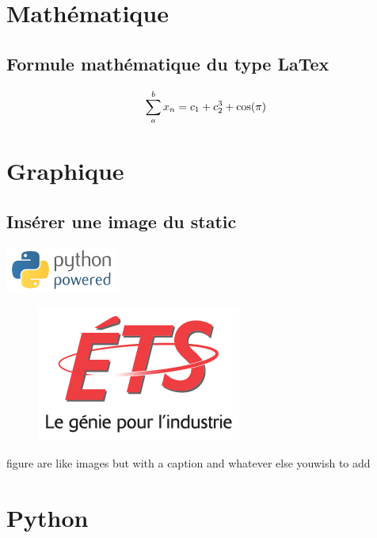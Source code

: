 \documentclass[letterpaper,10pt,english]{sphinxmanual}
\begin{document}
\section{Mathématique}
\label{sphinx:mathematique}

\subsection{Formule mathématique du type LaTex}
\label{sphinx:formule-mathematique-du-type-latex}\begin{gather}
\begin{split}\sum_{a}^{b} x_n = c_1 + c_2^3 + \cos(\pi)\end{split}\notag
\end{gather}

\section{Graphique}
\label{sphinx:graphique}

\subsection{Insérer une image du static}
\label{sphinx:inserer-une-image-du-static}
{\hfill\includegraphics{python-powered.png}}
\begin{figure}[htbp]
\centering

\includegraphics{ETS.png}
\end{figure}

figure are like images but with a caption and whatever else youwish to add


\section{Python}
\label{sphinx:python}
\end{document}
